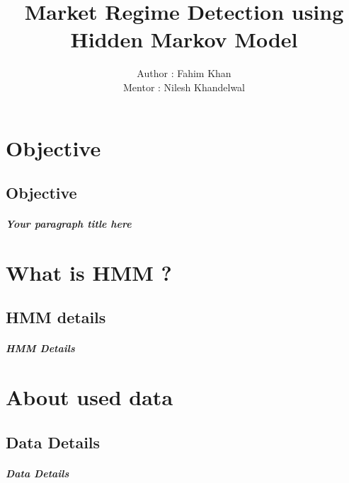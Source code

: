 \documentclass{report}
\author{Author : Fahim Khan \\
		Mentor : Nilesh Khandelwal
}
\title{Market Regime Detection using Hidden Markov Model}
\begin{document}
\maketitle
\tableofcontents



\chapter{Objective}
\section{Objective}
\paragraph{Your paragraph title here}


\chapter{What is HMM ?}
\section{HMM details}
\paragraph{HMM Details}

\chapter{About used data}
\section{Data Details}
\paragraph{Data Details}
\end{document}
